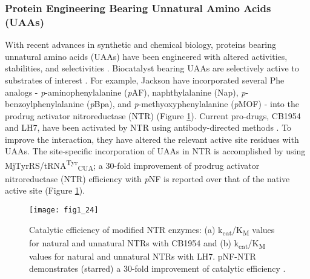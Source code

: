 \begin{refsection}
\subsubsection{Protein Engineering Bearing Unnatural Amino Acids (UAAs)}
\label{sec:uaa-intro}

With recent advances in synthetic and chemical biology, proteins bearing
unnatural amino acids (UAAs) have been engineered with altered activities,
stabilities, and selectivities
\cite{Odar2015,Hassan2008,Kiick2000,Hammill2007,Meinnel1990,Johnson2010}.
Biocatalyst bearing UAAs are selectively active to substrates of interest
\cite{Jackson2006a}. For example, Jackson  have incorporated
several Phe analogs - \emph{p}-aminophenylalanine (\emph{p}AF), naphthylalanine
(Nap), \emph{p}-benzoylphenylalanine (\emph{p}Bpa), and
\emph{p}-methyoxyphenylalanine (\emph{p}MOF) - into the prodrug activator
nitroreductase (NTR) \cite{Jackson2006a} (Figure
\ref{fig:selectivity-example}). Current pro-drugs, CB1954 and LH7, have been
activated by NTR using antibody-directed methods \cite{Grove2003}. To improve
the interaction, they have altered the relevant active site residues with UAAs.
The site-specific incorporation of UAAs in NTR is accomplished by using
MjTyrRS/tRNA\textsuperscript{Tyr}\textsubscript{CUA}; a 30-fold improvement of
prodrug activator nitroreductase (NTR) efficiency with \emph{p}NF is reported
over that of the native active site \cite{Jackson2006a} (Figure
\ref{fig:selectivity-example}).
\begin{figure}[htbp] \centering \texttt{[image: fig1\_24]}
    \caption[Catalytic efficiency of modified NTR enzymes: (a)
        k\textsubscript{cat}/K\textsubscript{M} values for natural and
        unnatural NTRs with CB1954 and (b)
        k\textsubscript{cat}/K\textsubscript{M} values for natural and
    unnatural NTRs with LH7.]{Catalytic efficiency of modified NTR enzymes: (a)
        k\textsubscript{cat}/K\textsubscript{M} values for natural and
        unnatural NTRs with CB1954 and (b)
        k\textsubscript{cat}/K\textsubscript{M} values for natural and
        unnatural NTRs with LH7. pNF-NTR demonstrates (starred) a 30-fold
        improvement of catalytic efficiency \cite{Jackson2006a}.}
        \label{fig:selectivity-example}
\end{figure}


\end{refsection}
